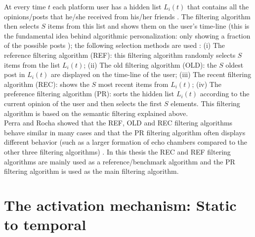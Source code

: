 \documentclass[11 pt , letterpaper , twoside , openright]{book}
\begin{document}
At every time $t$ each platform user has a hidden list $L_i(t)$ that contains all the opinions/posts that he/she received from his/her friends \cite{Perra2019}. The filtering algorithm then selects $S$ items from this list and shows them on the user's time-line (this is the fundamental idea behind algorithmic personalization: only showing a fraction of the possible posts \cite{Perra2019}); the following selection methods are used \cite{Perra2019}: (i) The reference filtering algorithm (REF): this filtering algorithm randomly selects $S$ items from the list $L_i(t)$; (ii) The old filtering algorithm (OLD): the $S$ oldest post in $L_i(t)$ are displayed on the time-line of the user; (iii) The recent filtering algorithm (REC): shows the $S$ most recent items from $L_i(t)$; (iv) The preference filtering algorithm (PR): sorts the hidden list $L_i(t)$ according to the current opinion of the user and then selects the first $S$ elements. This filtering algorithm is based on the semantic filtering explained above.\\
\newline
Perra and Rocha showed that the REF, OLD and REC filtering algorithms behave similar in many cases and that the PR filtering algorithm often displays different behavior (such as a larger formation of echo chambers compared to the other three filtering algorithms) \cite{Perra2019}. In this thesis the REC and REF filtering algorithms are mainly used as a reference/benchmark algorithm and the PR filtering algorithm is used as the main filtering algorithm.

\section{The activation mechanism: Static to temporal}\label{actMech}
\end{document}
